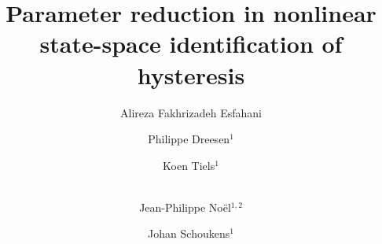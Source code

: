 \documentclass[review]{elsarticle}
\begin{document}
\begin{frontmatter}

\title{Parameter reduction in nonlinear state-space identification of hysteresis}

\author[*]{Alireza Fakhrizadeh Esfahani}
 
\author{Philippe Dreesen$^1$}
\author{Koen Tiels$^1$}
\author{\\ Jean-Philippe No\"el$^{1,2}$}
\author{Johan Schoukens$^1$}
\address{$^1$%
Vrije Universiteit Brussel (VUB), 
Department ELEC, 
Brussels, Belgium}
\address{$^2$%
University of Li\`ege, Space Structures and Systems Laboratory,
Aerospace and Mechanical Engineering Department,
Li\`ege, Belgium}


\end{frontmatter}
\end{document}
